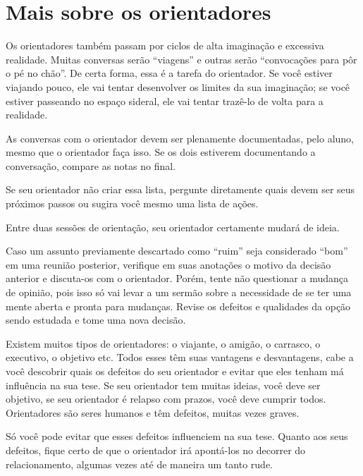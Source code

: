\section{Mais sobre os orientadores}


Os orientadores também passam por ciclos de alta imaginação e excessiva realidade. Muitas conversas serão ``viagens'' e outras serão ``convocações para pôr o pé no chão''. De certa forma, essa é a tarefa do orientador. Se você estiver viajando pouco, ele vai tentar desenvolver os limites da sua imaginação; se você estiver passeando no espaço sideral, ele vai tentar trazê-lo de volta para a realidade.


As conversas com o orientador devem ser plenamente documentadas, pelo aluno, mesmo que o orientador faça isso. Se os dois estiverem documentando a conversação, compare as notas no final. 




Se seu orientador não criar essa lista, pergunte diretamente quais devem ser seus próximos passos ou sugira você mesmo uma lista de ações. 


Entre duas sessões de orientação, seu orientador certamente mudará de ideia. 




Caso um assunto previamente descartado como ``ruim'' seja considerado ``bom'' em uma reunião posterior, verifique em suas anotações o motivo da decisão anterior e discuta-os com o orientador. Porém, tente não questionar a mudança de opinião, pois isso só vai levar a um sermão sobre a necessidade de se ter uma mente aberta e pronta para mudanças. Revise os defeitos e qualidades da opção sendo estudada e tome uma nova decisão.


Existem muitos tipos de orientadores: o viajante, o amigão, o carrasco, o executivo, o objetivo etc. Todos esses têm suas vantagens e desvantagens, cabe a você descobrir quais os defeitos do seu orientador e evitar que eles tenham má influência na sua tese. Se seu orientador tem muitas ideias, você deve ser objetivo, se seu orientador é relapso com prazos, você deve cumprir todos. Orientadores são seres humanos e têm defeitos, muitas vezes graves. 


Só você pode evitar que esses defeitos influenciem na sua tese. Quanto aos seus defeitos, fique certo de que o orientador irá apontá-los no decorrer do relacionamento, algumas vezes até de maneira um tanto rude.

